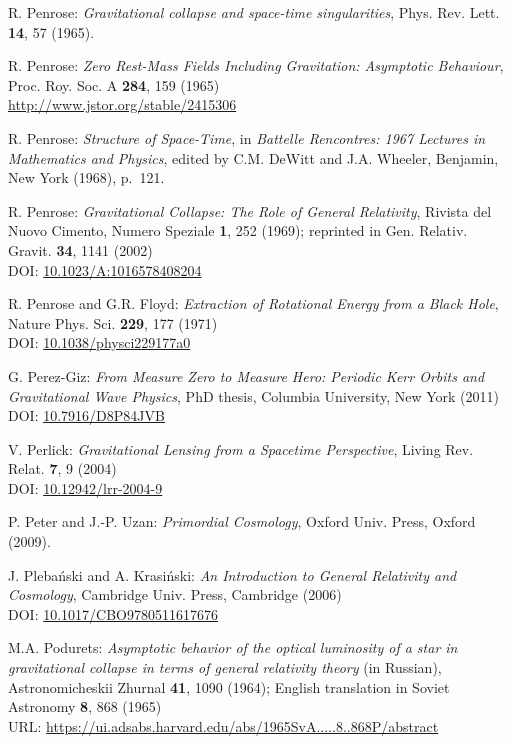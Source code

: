 \begin{thebibliography}{123}
R. Penrose: {\em Gravitational collapse and space-time singularities},
Phys. Rev. Lett. {\bf 14}, 57 (1965).

R. Penrose:
{\em Zero Rest-Mass Fields Including Gravitation: Asymptotic Behaviour},
Proc. Roy. Soc. A {\bf 284}, 159 (1965)\\
\url{http://www.jstor.org/stable/2415306}

R. Penrose: {\em Structure of Space-Time},
in {\em Battelle Rencontres: 1967 Lectures in Mathematics and Physics},
edited by C.M. DeWitt and J.A. Wheeler,
Benjamin, New York (1968), p.~121.

R. Penrose: {\em Gravitational Collapse: The Role of General Relativity},
Rivista del Nuovo Cimento, Numero Speziale {\bf 1}, 252 (1969); reprinted in
Gen. Relativ. Gravit. {\bf 34}, 1141 (2002)\\
DOI: \href{https://doi.org/10.1023/A:1016578408204}{10.1023/A:1016578408204}

R. Penrose and G.R. Floyd: {\em Extraction of Rotational Energy from
a Black Hole},  Nature Phys. Sci. {\bf 229}, 177 (1971)\\
DOI: \href{https://doi.org/10.1038/physci229177a0}{10.1038/physci229177a0}

G. Perez-Giz: {\em From Measure Zero to Measure Hero:
Periodic Kerr Orbits and Gravitational Wave Physics},
PhD thesis, Columbia University, New York (2011)\\
DOI: \href{https://doi.org/10.7916/D8P84JVB}{10.7916/D8P84JVB}

V. Perlick:
{\em Gravitational Lensing from a Spacetime Perspective},
Living Rev. Relat. {\bf 7}, 9 (2004)\\
DOI: \href{https://doi.org/10.12942/lrr-2004-9}{10.12942/lrr-2004-9}

P. Peter and J.-P. Uzan: {\em Primordial Cosmology},
Oxford Univ. Press, Oxford (2009).

J. Pleba\'nski and A. Krasi\'nski:
{\em An Introduction to General Relativity and Cosmology},
Cambridge Univ. Press, Cambridge (2006)\\
DOI: \href{https://doi.org/10.1017/CBO9780511617676}{10.1017/CBO9780511617676}

M.A. Podurets:
{\em Asymptotic behavior of the optical luminosity of a star in gravitational collapse
in terms of general relativity theory}
(in Russian),
Astronomicheskii Zhurnal {\bf 41}, 1090 (1964);
English translation in Soviet Astronomy {\bf 8}, 868 (1965)\\
URL: \url{https://ui.adsabs.harvard.edu/abs/1965SvA.....8..868P/abstract}


\end{thebibliography}
